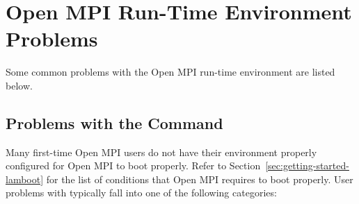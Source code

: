 
\section{Open MPI Run-Time Environment Problems}

Some common problems with the Open MPI run-time environment are listed
below.


\subsection{Problems with the  Command}

Many first-time Open MPI users do not have their environment properly
configured for Open MPI to boot properly.  Refer to
Section~\ref{sec:getting-started-lamboot} for the list of conditions
that Open MPI requires to boot properly.  User problems with 
typically fall into one of the following categories:

